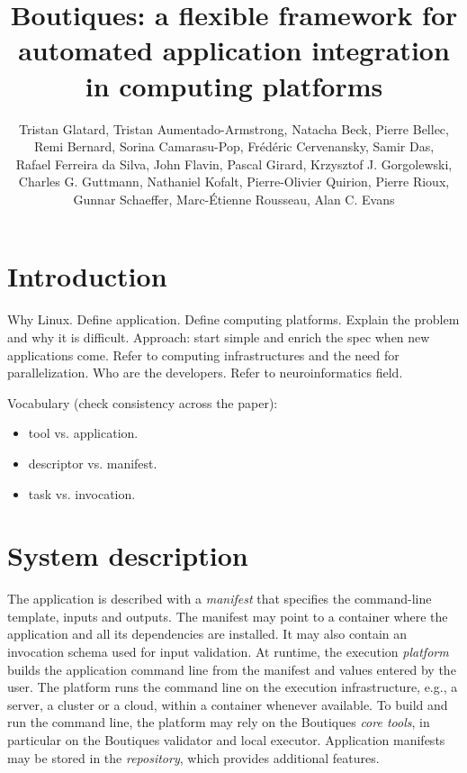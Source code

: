 \documentclass{article}
\title{Boutiques: a flexible framework for automated application integration in computing platforms}
\begin{document}
\author{Tristan Glatard, Tristan Aumentado-Armstrong, Natacha Beck, Pierre Bellec,\\
        Remi Bernard, Sorina Camarasu-Pop, Fr\'ed\'eric Cervenansky, Samir Das, \\
        Rafael Ferreira da Silva, John Flavin, Pascal Girard, Krzysztof J. Gorgolewski, \\
        Charles G. Guttmann, Nathaniel Kofalt, Pierre-Olivier Quirion, Pierre Rioux,\\
        Gunnar Schaeffer, Marc-\'Etienne Rousseau, Alan C. Evans}

\maketitle

\section{Introduction}

Why Linux. Define application. Define computing platforms. Explain the
problem and why it is difficult. Approach: start simple and enrich the
spec when new applications come. Refer to computing infrastructures
and the need for parallelization. Who are
the developers. Refer to neuroinformatics field. 

Vocabulary (check consistency across the paper):
\begin{itemize}
\item tool vs. application.
\item descriptor vs. manifest.
\item task vs. invocation.
\end{itemize}

\section{System description}

The application is described with a \emph{manifest} that specifies the
command-line template, inputs and outputs. The manifest may point to a
container where the application and all its dependencies are
installed. It may also contain an invocation schema used for input
validation. At runtime, the execution \emph{platform} builds the
application command line from the manifest and values entered by the
user. The platform runs the command line on the execution
infrastructure, e.g., a server, a cluster or a cloud, within a
container whenever available. To build and run the command line, the
platform may rely on the Boutiques \emph{core tools}, in particular on
the Boutiques validator and local executor. Application manifests may
be stored in the \emph{repository}, which provides additional features.
\end{document}
